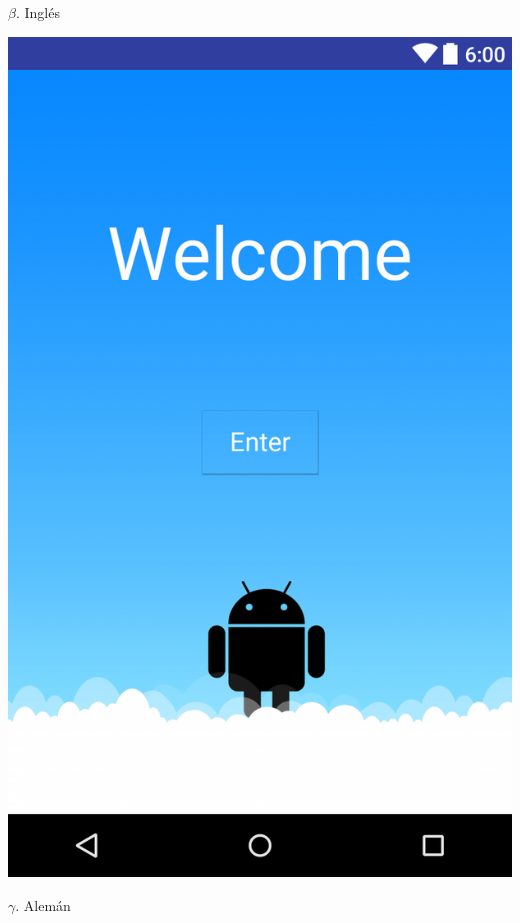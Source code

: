 \documentclass{article}
\begin{document}
$\beta$. Ingl\'es\

\begin{center}

\includegraphics[scale=.15]{layout-2016-04-17-Eng_lay.png} 

\end{center}

\newpage

$\gamma$. Alem\'an\
\end{document}
